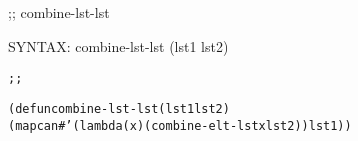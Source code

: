 \begin{aibox}{\function}
;; combine-lst-lst

SYNTAX: combine-lst-lst (lst1 lst2)
\end{aibox}

\begin{aibox}{\examples}

\end{aibox}

\begin{aibox}{\comments}

\end{aibox}
\begin{aibox}{\answers}

\end{aibox}
\begin{aibox}{\othercomments}

\end{aibox}
\begin{aibox}{\pseudocode}

\end{aibox}
\begin{aibox}{\code}

\begin{alltt}
;;%% code

(defun combine-lst-lst (lst1 lst2)
            (mapcan #'(lambda (x) (combine-elt-lst x lst2)) lst1))

\end{alltt}
\end{aibox}
